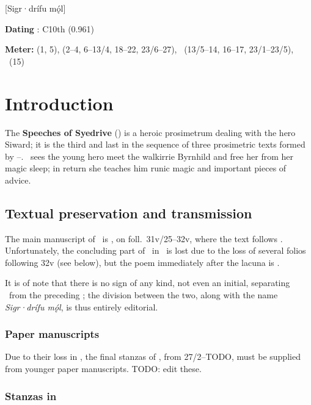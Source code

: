 [Sigr·drífu mǫ́l]

\begin{flushright}%
\textbf{Dating} \parencite{Sapp2022}: C10th (0.961)

\textbf{Meter:} \Fornyrdislag (1, 5), \Ljodahattr (2--4, 6--13/4, 18--22, 23/6--27), \Galdralag\ (13/5--14, 16--17, 23/1--23/5), \Malahattr\ (15)%
\end{flushright}

\section{Introduction}

The \textbf{Speeches of Syedrive} (\Sigrdrifumal) is a heroic prosimetrum dealing with the hero Siward; it is the third and last in the sequence of three prosimetric texts formed by --.  \Sigrdrifumal\ sees the young hero meet the walkirrie Byrnhild and free her from her magic sleep; in return she teaches him runic magic and important pieces of advice.

\subsection{Textual preservation and transmission}

The main manuscript of \Sigrdrifumal\ is \Regius, on foll.~31v/25--32v, where the text follows .  Unfortunately, the concluding part of \Sigrdrifumal\ in \Regius\ is lost due to the loss of several folios following 32v (see  below), but the poem immediately after the lacuna is .

It is of note that there is no sign of any kind, not even an initial, separating \Sigrdrifumal\ from the preceding ; the division between the two, along with the name \emph{Sigr·drífu mǫ́l}, is thus entirely editorial.

\subsubsection{Paper manuscripts}

Due to their loss in \Regius, the final stanzas of \Sigrdrifumal, from 27/2--TODO, must be supplied from younger paper manuscripts.  TODO: edit these.

\subsubsection{Stanzas in \VolsungaSaga}

